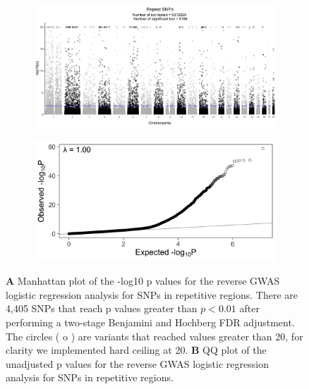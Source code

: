 \documentclass[9pt,lineno]{elife}
\begin{document}
\begin{figure} \centering
    \begin{subfigure}[b]{\linewidth}
        \includegraphics[width=\hsize]{./Figures/ManhattanPlot_RepeatSNPs.jpg}
        \label{fig:a}
    \end{subfigure} %

    \begin{subfigure}[b]{\linewidth}
    	\center    
        \includegraphics[width=\hsize]{./Figures/QQPlot_RepeatSNPs.jpg}
        \label{fig:b}    
    \end{subfigure} 
    \caption{\textbf{A} Manhattan plot of the -log10 p values for the reverse GWAS logistic regression analysis for SNPs in repetitive regions. There are 4,405 SNPs that reach p values greater than $ p < 0.01$ after performing a two-stage Benjamini and Hochberg FDR adjustment.  The circles ( o ) are variants that reached values greater than 20, for clarity we implemented hard ceiling at 20. 
  \textbf{B} QQ plot of the unadjusted p values for the reverse GWAS logistic regression analysis for SNPs in repetitive regions.}
  \label{RS_Manhattan}
  \end{figure}
  
\end{document}

